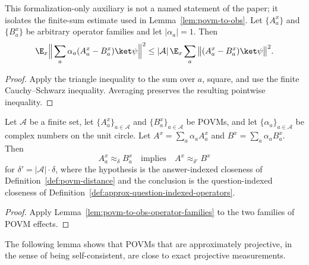\begin{lemma}
	\label{lem:povm-to-obs-operator-families}
	\leanok
	This formalization-only auxiliary is not a named statement of the paper; it
	isolates the finite-sum estimate used in Lemma~\ref{lem:povm-to-obs}. Let
	$\{A^x_a\}$ and $\{B^x_a\}$ be arbitrary operator families and let
	$|\alpha_a|=1$. Then
	\[
		\E_x \Big\|\sum_a \alpha_a(A^x_a-B^x_a)\ket\psi\Big\|^2
		\leq |\mathcal A|\,\E_x\sum_a
		\big\|(A^x_a-B^x_a)\ket\psi\big\|^2.
	\]
\end{lemma}
\begin{proof}
	\leanok
	Apply the triangle inequality to the sum over $a$, square, and use the
	finite Cauchy--Schwarz inequality. Averaging preserves the resulting
	pointwise inequality.
\end{proof}

\begin{lemma}
	\label{lem:povm-to-obs}
	\leanok
	Let $\mathcal{A}$ be a finite set, let $\{A^x_a\}_{a \in \mathcal{A}}$
	and $\{B^x_a\}_{a \in \mathcal{A}}$ be POVMs, and let
	$\{\alpha_a\}_{a \in \mathcal{A}}$ be complex numbers on the unit
	circle. Let $A^x = \sum_a \alpha_a A^x_a$ and
	$B^x = \sum_a \alpha_a B^x_a$. Then
	\[
		A^x_a \approx_\delta B^x_a \quad\text{implies}\quad A^x \approx_{\delta'} B^x
	\]
	for $\delta' = |\mathcal{A}| \cdot \delta$, where the hypothesis is the
	answer-indexed closeness of Definition~\ref{def:povm-distance} and the
	conclusion is the question-indexed closeness of
	Definition~\ref{def:approx-question-indexed-operators}.
\end{lemma}
\begin{proof}
	\leanok
	Apply Lemma~\ref{lem:povm-to-obs-operator-families} to the two families of
	POVM effects.
\end{proof}

The following lemma shows that POVMs that are approximately projective, in
the sense of being self-consistent, are close to exact projective
measurements.

